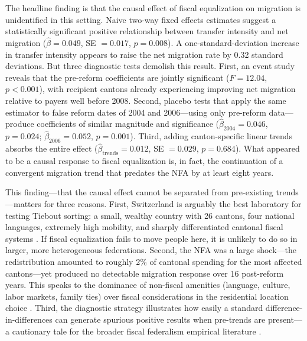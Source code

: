 \documentclass[12pt]{article}
\begin{document}
The headline finding is that the causal effect of fiscal equalization on migration is unidentified in this setting. Naive two-way fixed effects estimates suggest a statistically significant positive relationship between transfer intensity and net migration ($\hat{\beta} = 0.049$, SE $= 0.017$, $p = 0.008$). A one-standard-deviation increase in transfer intensity appears to raise the net migration rate by 0.32 standard deviations. But three diagnostic tests demolish this result. First, an event study reveals that the pre-reform coefficients are jointly significant ($F = 12.04$, $p < 0.001$), with recipient cantons already experiencing improving net migration relative to payers well before 2008. Second, placebo tests that apply the same estimator to false reform dates of 2004 and 2006---using only pre-reform data---produce coefficients of similar magnitude and significance ($\hat{\beta}_{2004} = 0.046$, $p = 0.024$; $\hat{\beta}_{2006} = 0.052$, $p = 0.001$). Third, adding canton-specific linear trends absorbs the entire effect ($\hat{\beta}_{\text{trends}} = 0.012$, SE $= 0.029$, $p = 0.684$). What appeared to be a causal response to fiscal equalization is, in fact, the continuation of a convergent migration trend that predates the NFA by at least eight years.

This finding---that the causal effect cannot be separated from pre-existing trends---matters for three reasons. First, Switzerland is arguably the best laboratory for testing Tiebout sorting: a small, wealthy country with 26 cantons, four national languages, extremely high mobility, and sharply differentiated cantonal fiscal systems \citep{kirchgassner2002effects, schmidheiny2006income}. If fiscal equalization fails to move people here, it is unlikely to do so in larger, more heterogeneous federations. Second, the NFA was a large shock---the redistribution amounted to roughly 2\% of cantonal spending for the most affected cantons---yet produced no detectable migration response over 16 post-reform years. This speaks to the dominance of non-fiscal amenities (language, culture, labor markets, family ties) over fiscal considerations in the residential location choice \citep{bayer2009tiebout, brulhart2015does}. Third, the diagnostic strategy illustrates how easily a standard difference-in-differences can generate spurious positive results when pre-trends are present---a cautionary tale for the broader fiscal federalism empirical literature \citep{roth2023pretest, sun2021estimating}.
\end{document}
